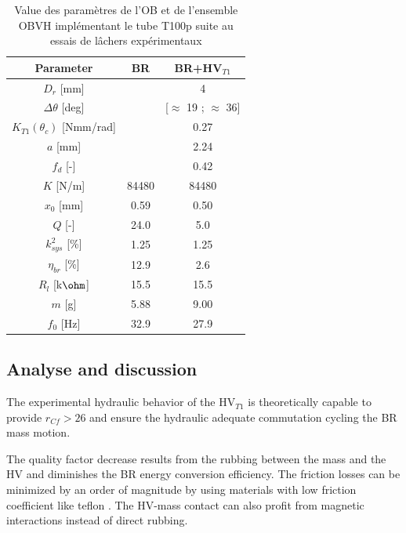 \documentclass[3p,twocolumn,preprint]{elsarticle}
\begin{document}
\begin{table}[!htbp]
	\centering
		\begin{tabular}[t]{c|c|c}
\toprule
\multicolumn{1}{c}{\textbf{Parameter}}	&
\multicolumn{1}{c}{\textbf{BR}} 	& 
\multicolumn{1}{c}{\textbf{BR+HV$_{T1}$}}  \\
\midrule
$D_r$ [mm] 						& \cellcolor{ashgrey} 		& {4} 		\\ \hline
$\Delta\theta$ [deg] 			& \cellcolor{ashgrey} 		& {{[$\approx$ 19 ; $\approx$ 36]}} \\ \hline
$K_{T1}(\theta_c)$ [Nmm/rad]	& \cellcolor{ashgrey}  		&  0.27 		\\ \hline
$a$ [mm]         			    & \cellcolor{ashgrey}  		&  2.24		\\ \hline
$f_d$ [-] 						& \cellcolor{ashgrey}  		&  0.42  		\\ \hline
$K$ [N/m] 						&	84480			  	 	&  84480  			\\ \hline
$x_0$ [mm] 						& {0.59}					& {0.50}  	\\ \hline
$Q$	[-] 						& 		24.0		 		& 5.0     					\\ \hline
$k^2_{sys}$ [\%] 				& 		1.25		 		& {1.25}   	\\ \hline
$\eta_{br}$ [\%] 				& 		12.9		 		& 2.6   \\ \hline	
$R_l$ [k$\text{\ohm}$] 			&	{15.5}					& {15.5}   	\\ \hline		
$m$	[g]						    &	{5.88}					& 9.00   		\\ \hline	
$f_0$ [Hz]						&		32.9				& 27.9   					\\
\bottomrule	
	\end{tabular}
        \caption{Value des paramètres de l'OB et de l'ensemble OBVH implémentant le tube T100p suite au essais de lâchers expérimentaux}
        \label{tab:parametres lacher tube}
\end{table}        
	\subsection{Analyse and discussion}
The experimental hydraulic behavior of the HV$_{T1}$ is theoretically capable to provide \mbox{$r_{Cf}>26$} and ensure the hydraulic adequate commutation cycling the BR mass motion.

The quality factor decrease results from the rubbing between the mass and the HV and diminishes the BR energy conversion efficiency. The friction losses can be minimized by an order of magnitude by using materials with low friction coefficient like teflon \cite{Nosonovsky2013}. The HV-mass contact can also profit from magnetic interactions instead of direct rubbing.
\end{document}
